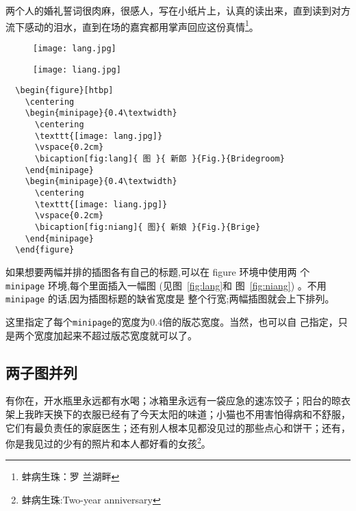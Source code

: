 两个人的婚礼誓词很肉麻，很感人，写在小纸片上，认真的读出来，直到读到对方
流下感动的泪水，直到在场的嘉宾都用掌声回应这份真情\footnote{蚌病生珠：罗
  兰湖畔}。

\begin{figure}[htbp]
  \centering
  \begin{minipage}{0.4\textwidth}
    \centering
    \texttt{[image: lang.jpg]}
    \vspace{0.2cm}
  \end{minipage}
  \begin{minipage}{0.4\textwidth}
    \centering
    \texttt{[image: liang.jpg]}
    \vspace{0.2cm}
  \end{minipage}
\end{figure}

\begin{lstlisting}
  \begin{figure}[htbp]
    \centering
    \begin{minipage}{0.4\textwidth}
      \centering
      \texttt{[image: lang.jpg]}
      \vspace{0.2cm}
      \bicaption[fig:lang]{ 图 }{ 新郎 }{Fig.}{Bridegroom}
    \end{minipage}
    \begin{minipage}{0.4\textwidth}
      \centering
      \texttt{[image: liang.jpg]}
      \vspace{0.2cm}
      \bicaption[fig:niang]{ 图}{ 新娘 }{Fig.}{Brige}
    \end{minipage}
  \end{figure}
\end{lstlisting}


如果想要两幅并排的插图各有自己的标题,可以在 figure 环境中使用两
个 \texttt{minipage} 环境,每个里面插入一幅图 (见图~\ref{fig:lang}和
图~\ref{fig:niang}) 。不用 \texttt{minipage} 的话,因为插图标题的缺省宽度是
整个行宽;两幅插图就会上下排列。

这里指定了每个\texttt{minipage}的宽度为0.4倍的版芯宽度。当然，也可以自
己指定，只是两个宽度加起来不超过版芯宽度就可以了。


\subsection{两子图并列}

有你在，开水瓶里永远都有水喝；冰箱里永远有一袋应急的速冻饺子；阳台的晾衣
架上我昨天换下的衣服已经有了今天太阳的味道；小猫也不用害怕得病和不舒服，
它们有最负责任的家庭医生；还有别人根本见都没见过的那些点心和饼干；还有，
你是我见过的少有的照片和本人都好看的女孩\footnote{蚌病生珠:Two-year
  anniversary}。

